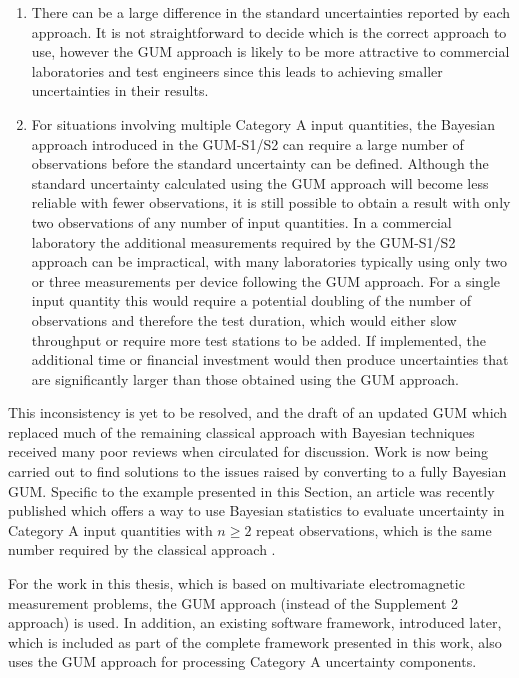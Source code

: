 \documentclass[../thesis/thesis.tex]{subfiles}
\begin{document}
\begin{refsection}
\begin{enumerate}
	\item There can be a large difference in the standard uncertainties reported by each approach. It is not straightforward to decide which is the correct approach to use, however the GUM approach is likely to be more attractive to commercial laboratories and test engineers since this leads to achieving smaller uncertainties in their results.
	\item For situations involving multiple Category A input quantities, the Bayesian approach introduced in the GUM-S1/S2 can require a large number of observations before the standard uncertainty can be defined. Although the standard uncertainty calculated using the GUM approach will become less reliable with fewer observations, it is still possible to obtain a result with only two observations of any number of input quantities. In a commercial laboratory the additional measurements required by the GUM-S1/S2 approach can be impractical, with many laboratories typically using only two or three measurements per device following the GUM approach. For a single input quantity this would require a potential doubling of the number of observations and therefore the test duration, which would either slow throughput or require more test stations to be added. If implemented, the additional time or financial investment would then produce uncertainties that are significantly larger than those obtained using the GUM approach.
\end{enumerate}

This inconsistency is yet to be resolved, and the draft of an updated GUM which replaced much of the remaining classical approach with Bayesian techniques received many poor reviews when circulated for discussion. Work is now being carried out to find solutions to the issues raised by converting to a fully Bayesian GUM. Specific to the example presented in this Section, an article was recently published which offers a way to use Bayesian statistics to evaluate uncertainty in Category A input quantities with $n \ge 2$ repeat observations, which is the same number required by the classical approach \cite{Cox_2017}.

For the work in this thesis, which is based on multivariate electromagnetic measurement problems, the GUM approach (instead of the Supplement 2 approach) is used. In addition, an existing software framework, introduced later, which is included as part of the complete framework presented in this work, also uses the GUM approach for processing Category A uncertainty components.


\end{refsection}
\end{document}
